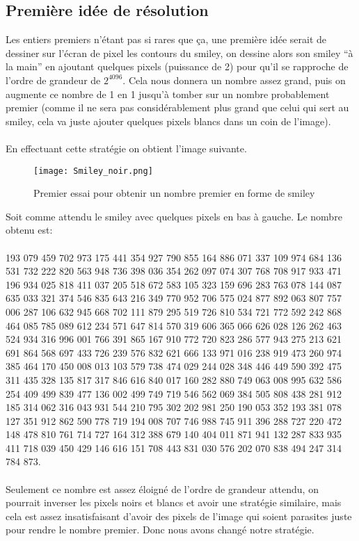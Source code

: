\documentclass{article}
\begin{document}
\subsection{Première idée de résolution}

Les entiers premiers n'étant pas si rares que ça, une première idée serait de dessiner sur l’écran de pixel les contours du smiley, on dessine alors son smiley “à la main” en ajoutant quelques pixels (puissance de 2) pour qu'il se rapproche de l'ordre de grandeur de $2^{4096}$. Cela nous donnera un nombre assez grand, puis on augmente ce nombre de 1 en 1 jusqu’à tomber sur un nombre probablement premier (comme il ne sera pas considérablement plus grand que celui qui sert au smiley, cela va juste ajouter quelques pixels blancs dans un coin de l’image).\\ \\
En effectuant cette stratégie on obtient l'image suivante.

\begin{figure}[H]
    \centering
    \texttt{[image: Smiley\_noir.png]}
    \caption{Premier essai pour obtenir un nombre premier en forme de smiley}
    \label{fig:enter-label}
\end{figure}

Soit comme attendu le smiley avec quelques pixels en bas à gauche. 
Le nombre obtenu est:\\ \\
193 079 459 702 973 175 441 354 927 790 855 164 886 071 337 109 974 684 136 531 732 222 820 563 948 736 398 036 354 262 097 074 307 768 708 917 933 471 196 934 025 818 411 037 205 518 672 583 105 323 159 696 283 763 078 144 087 635 033 321 374 546 835 643 216 349 770 952 706 575 024 877 892 063 807 757 006 287 106 632 945 668 702 111 879 295 519 726 810 534 721 772 592 242 868 464 085 785 089 612 234 571 647 814 570 319 606 365 066 626 028 126 262 463 524 934 316 996 001 766 391 865 167 910 772 720 823 286 577 943 275 213 621 691 864 568 697 433 726 239 576 832 621 666 133 971 016 238 919 473 260 974 385 464 170 450 008 013 103 579 738 474 029 244 028 348 446 449 590 392 475 311 435 328 135 817 317 846 616 840 017 160 282 880 749 063 008 995 632 586 254 409 499 839 477 136 002 499 749 719 546 562 069 384 505 808 438 281 912 185 314 062 316 043 931 544 210 795 302 202 981 250 190 053 352 193 381 078 127 351 912 862 590 778 719 194 008 707 746 988 745 911 396 288 727 220 472 148 478 810 761 714 727 164 312 388 679 140 404 011 871 941 132 287 833 935 411 718 039 450 429 146 616 151 708 443 831 030 576 202 070 838 494 247 314 784 873.\\ \\
Seulement ce nombre est assez éloigné de l'ordre de grandeur attendu, on pourrait inverser les pixels noirs et blancs et avoir une stratégie similaire, mais cela est assez insatisfaisant d'avoir des pixels de l'image qui soient parasites juste pour rendre le nombre premier. Donc nous avons changé notre stratégie.
\end{document}
